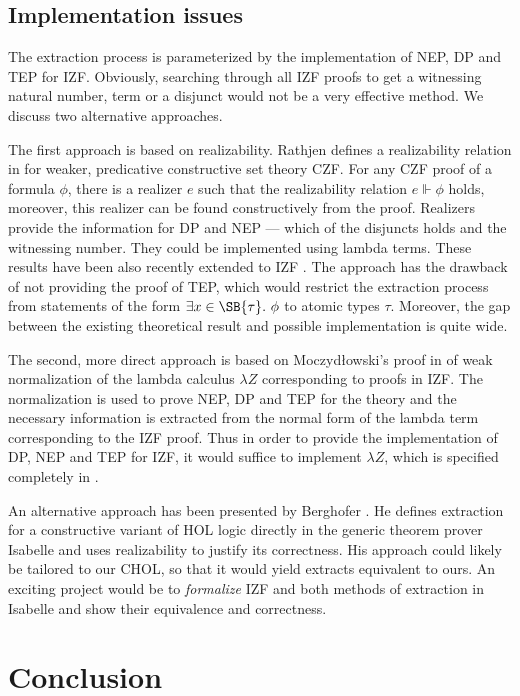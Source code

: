 \documentclass{LMCS}
\newcommand\reals{\ensuremath{\Vdash}}
\begin{document}
\subsection{Implementation issues}\label{dpnep}

The extraction process is parameterized by the implementation of NEP, DP and
TEP for IZF. Obviously, searching through all IZF proofs to get a
witnessing natural number, term or a disjunct would not be a very effective method. 
We discuss two alternative approaches.

The first approach is based on realizability. Rathjen
defines a realizability relation in  \cite{Rat05} for weaker, predicative constructive set
theory CZF. For any CZF proof of a formula $\phi$, there is a realizer $e$ such
that the realizability relation $e \reals \phi$ holds, moreover, this
realizer can be found constructively from the proof. Realizers provide
the information for DP and NEP --- which of the disjuncts holds and the
witnessing number. They could be implemented using lambda terms. 
These results have been also recently extended to IZF \cite{rathjen2006}.
The approach has the drawback of not providing the proof of TEP, which
would restrict the extraction process from statements of the form $\exists x \in \SB{\tau}.\
\phi$ to atomic types $\tau$. Moreover, the gap between the existing theoretical
result and possible implementation is quite wide.

The second, more direct approach is based on Moczyd\l owski's proof in
\cite{jacsl2006} of weak
normalization of the lambda calculus $\lambda Z$ corresponding to proofs in IZF. The normalization is used to prove NEP, DP and TEP for the
theory and the necessary information is extracted from the normal form of the
lambda term corresponding to the IZF proof. Thus in order to provide the implementation of DP, NEP and 
TEP for IZF, it would suffice to implement $\lambda Z$, which is specified
completely in \cite{jacsl2006,jatrinac2006}.

An alternative approach has been presented by Berghofer \cite{Ber04}. He
defines extraction for a constructive variant of HOL logic directly in
the generic theorem prover Isabelle and uses realizability to justify its
correctness. His approach could likely be tailored to our CHOL, so that it
would yield extracts equivalent to ours. An exciting project would be to
\emph{formalize} IZF and both methods of extraction in Isabelle and show
their equivalence and correctness. 

\section{Conclusion}\label{conclusion}
\end{document}
